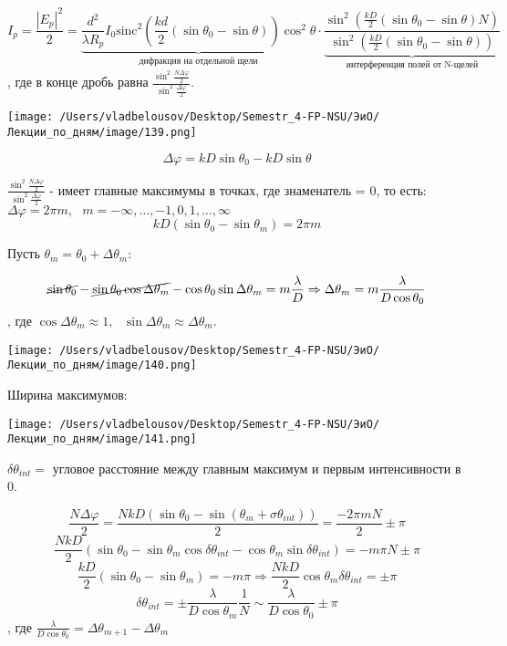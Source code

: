 \documentclass[12pt, a4paper]{report}
\begin{document}
\[ I_p = \frac{\left\lvert  E_p \right\rvert ^2 }{2 } = \underbrace{\frac{d ^2 }{\lambda R_p } I_0 \mathrm{sinc } ^2 \left( \frac{kd}{2 } (\sin \theta_0 - \sin \theta) \right) \cos ^2 \theta}_{\text{дифракция на отдельной щели} } \cdot  \underbrace{\frac{\sin ^2 \displaystyle  \left(  \frac{kD}{2 } (\sin \theta_0 - \sin \theta) N \right)}{\sin  ^2 \displaystyle  \left( \frac{kD}{2 } (\sin \theta_0 - \sin \theta)  \right)}  }_{\text{интерференция полей от N-щелей} }   \] 
, где в конце дробь равна \( \frac{ \displaystyle  \sin  ^2 \frac{N \Delta \varphi }{2} }{\displaystyle \sin  ^2 \frac{ \Delta \varphi }{2} }  \). 

\begin{center}
    \texttt{[image: /Users/vladbelousov/Desktop/Semestr\_4-FP-NSU/ЭиО/Лекции\_по\_дням/image/139.png]}
\end{center}
\[ \Delta \varphi = kD \sin \theta_0 - k D \sin  \theta \] 

\( \displaystyle   \frac{ \displaystyle  \sin  ^2 \frac{N \Delta \varphi }{2} }{\displaystyle \sin  ^2 \frac{ \Delta \varphi }{2} } \) - имеет главные максимумы в точках, где знаменатель = 0, то есть: \( \Delta \varphi = 2 \pi m , \text{ }  m = - \infty, \ldots, -1,0,1, \ldots, \infty  \) 
\[ kD (\sin \theta_0 - \sin  \theta_m ) = 2\pi m  \] 

Пусть \( \theta_m = \theta_0 + \Delta \theta_m : \) 

\[ \cancel{ \sin \theta_0} - \cancel{\sin \theta_0 \cos  \Delta \theta_m} - \cos \theta_0 \sin \Delta \theta_m = m \frac{\lambda}{D} \Rightarrow \Delta \theta_m =  m \frac{\lambda }{D \cos  \theta_0}   \] 
, где \( \cos  \Delta \theta_m \approx 1 , \text{ }  \sin  \Delta \theta_m \approx \Delta \theta_m \). 

\begin{center}
    \texttt{[image: /Users/vladbelousov/Desktop/Semestr\_4-FP-NSU/ЭиО/Лекции\_по\_дням/image/140.png]}
\end{center}

Ширина максимумов: 

\begin{center}
    \texttt{[image: /Users/vladbelousov/Desktop/Semestr\_4-FP-NSU/ЭиО/Лекции\_по\_дням/image/141.png]}
\end{center}

\( \delta \theta_{int } =   \)  угловое расстояние между главным максимум  и первым  интенсивности в 0. 

\[ \frac{N \Delta \varphi }{2 } =\frac{N k D (\sin  \theta_0 - \sin (\theta_m + \sigma \theta_{ int } ))}{2 } = \frac{ - 2 \pi m N }{2 } \pm  \pi    \] 
\[ \frac{ N k D }{2 } ( \sin  \theta_0 - \sin  \theta_m \cos  \delta \theta_{ int }  - \cos  \theta_m  \sin \delta \theta_{ int }  ) = - m \pi N \pm  \pi  \] 
\[  \frac{k D }{2 } (\sin  \theta_0 - \sin \theta_m) = - m \pi \Rightarrow \frac{N k D }{2 }  \cos \theta_m \delta \theta_{ int }  = \pm  \pi\] 
\[ \delta \theta_{ int }  =  \pm \frac{\lambda}{D \cos  \theta_m }\frac{1}{N  }  \sim \frac{\lambda}{D \cos \theta_0 } \pm  \pi   \] 
, где \( \displaystyle  \frac{\lambda}{D \cos \theta_0} = \Delta \theta_{m + 1 }  - \Delta \theta_m  \) \\
\end{document}
